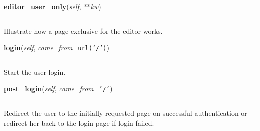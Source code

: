 \hspace{.8\funcindent}\begin{boxedminipage}{\funcwidth}

    \raggedright \textbf{editor\_user\_only}(\textit{self}, **\textit{kw})

    \vspace{-1.5ex}

    \rule{\textwidth}{0.5\fboxrule}
\setlength{\parskip}{2ex}
    Illustrate how a page exclusive for the editor works.

\setlength{\parskip}{1ex}
    \end{boxedminipage}

    \label{saip:controllers:root:RootController:login}

    \vspace{0.5ex}

\hspace{.8\funcindent}\begin{boxedminipage}{\funcwidth}

    \raggedright \textbf{login}(\textit{self}, \textit{came\_from}={\tt url('/')})

    \vspace{-1.5ex}

    \rule{\textwidth}{0.5\fboxrule}
\setlength{\parskip}{2ex}
    Start the user login.

\setlength{\parskip}{1ex}
    \end{boxedminipage}

    \label{saip:controllers:root:RootController:post_login}

    \vspace{0.5ex}

\hspace{.8\funcindent}\begin{boxedminipage}{\funcwidth}

    \raggedright \textbf{post\_login}(\textit{self}, \textit{came\_from}={\tt '/'})

    \vspace{-1.5ex}

    \rule{\textwidth}{0.5\fboxrule}
\setlength{\parskip}{2ex}
    Redirect the user to the initially requested page on successful 
    authentication or redirect her back to the login page if login failed.

\setlength{\parskip}{1ex}
    \end{boxedminipage}

